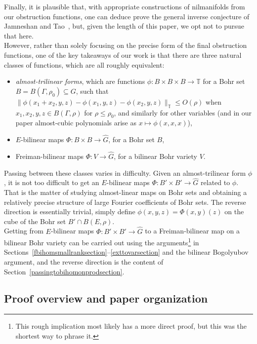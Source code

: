 \documentclass[a4paper,11pt]{article}
\numberwithin{theorem}{section}
\theoremstyle{definition}
\begin{document}
Finally, it is plausible that, with appropriate constructions of nilmanifolds from our obstruction functions, one can deduce prove the general inverse conjecture of Jamneshan and Tao~\cite{JamTao}, but, given the length of this paper, we opt not to pursue that here.\\

However, rather than solely focusing on the precise form of the final obstruction functions, one of the key takeaways of our work is that there are three natural classes of functions, which are all roughly equivalent:
\begin{itemize}
    \item \textit{almost-trilinear forms}, which are functions $\phi : B \times B \times B \to \mathbb{T}$ for a Bohr set $B = B(\Gamma, \rho_0) \subseteq G$, such that $\|\phi(x_1 + x_2, y, z) - \phi(x_1, y,z) - \phi(x_2, y, z)\|_{\mathbb{T}} \leq O(\rho)$ when $x_1, x_2, y, z \in B(\Gamma, \rho)$ for $\rho \leq \rho_0$, and similarly for other variables (and in our paper almost-cubic polynomials arise as $x \mapsto \phi(x, x, x)$), 
    \item $E$-bilinear maps $\Phi: B \times B\to \hat{G}$, for a Bohr set $B$,
    \item Freiman-bilinear maps $\Phi : V \to \hat{G}$, for a bilinear Bohr variety $V$.
\end{itemize}

Passing between these classes varies in difficulty. Given an almost-trilinear form $\phi$, it is not too difficult to get an $E$-bilinear maps $\Phi: B' \times B'\to \hat{G}$ related to $\phi$. That is the matter of studying almost-linear maps on Bohr sets and obtaining a relatively precise structure of large Fourier coefficients of Bohr sets. The reverse direction is essentially trivial, simply define $\phi(x,y,z) = \Phi(x,y)(z)$ on the cube of the Bohr set $B' \cap B(E, \rho)$.\\
Getting from $E$-bilinear maps $\Phi: B' \times B'\to \hat{G}$ to a Freiman-bilinear map on a bilinear Bohr variety can be carried out using the arguments\footnote{This rough implication most likely has a more direct proof, but this was the shortest way to phrase it.} in Sections~\ref{fbihomsmallranksection}--\ref{exttovarsection} and the bilinear Bogolyubov argument, and the reverse direction is the content of Section~\ref{passingtobihomonprodsection}. 
   
\subsection{Proof overview and paper organization}
\end{document}
